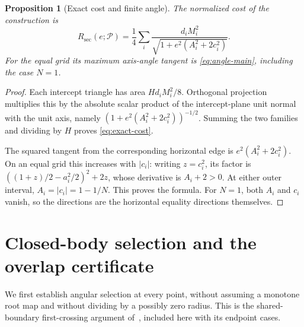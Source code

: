\documentclass[11pt]{amsart}
\newtheorem{proposition}[theorem]{Proposition}
\theoremstyle{definition}
\theoremstyle{remark}
\newcommand{\Rsec}{R_{\mathrm{sec}}}
\begin{document}
\begin{proposition}[Exact cost and finite angle]\label{prop:cost}
The normalized cost of the construction is
\begin{equation}\label{eq:exact-cost}
 \Rsec(e;\mathcal P)=\frac14\sum_i
       \frac{d_iM_i^2}{\sqrt{1+e^2(A_i^2+2c_i^2)}}.
\end{equation}
For the equal grid its maximum axis-angle tangent is
\eqref{eq:angle-main}, including the case $N=1$.
\end{proposition}
\begin{proof}
Each intercept triangle has area $Hd_iM_i^2/8$. Orthogonal projection
multiplies this by the absolute scalar product of the intercept-plane
unit normal with the unit axis, namely
$(1+e^2(A_i^2+2c_i^2))^{-1/2}$. Summing the two families and dividing
by $H$ proves \eqref{eq:exact-cost}.

The squared tangent from the corresponding horizontal edge is
$e^2(A_i^2+2c_i^2)$. On an equal grid this increases with $|c_i|$:
writing $z=c_i^2$, its factor is
$((1+z)/2-a_i^2/2)^2+2z$, whose derivative is $A_i+2>0$.
At either outer interval, $A_i=|c_i|=1-1/N$. This proves the formula.
For $N=1$, both $A_i$ and $c_i$ vanish, so the directions are the
horizontal equality directions themselves.
\end{proof}

\section{Closed-body selection and the overlap certificate}

We first establish angular selection at every point, without assuming a
monotone root map and without dividing by a possibly zero radius. This is
the shared-boundary first-crossing argument of~\cite{Angular}, included
here with its endpoint cases.
\end{document}
